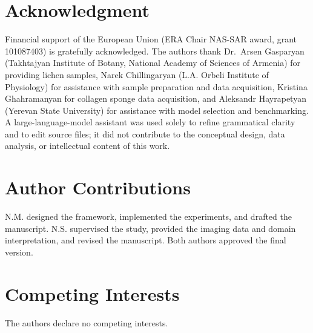 \documentclass[journal]{IEEEtran}
\begin{document}
\section*{Acknowledgment}
Financial support of the European Union (ERA Chair NAS-SAR award, grant 101087403) is gratefully acknowledged. The authors thank Dr.~Arsen Gasparyan (Takhtajyan Institute of Botany, National Academy of Sciences of Armenia) for providing lichen samples, Narek Chillingaryan (L.A. Orbeli Institute of Physiology) for assistance with sample preparation and data acquisition, Kristina Ghahramanyan for collagen sponge data acquisition, and Aleksandr Hayrapetyan (Yerevan State University) for assistance with model selection and benchmarking. A large-language-model assistant was used solely to refine grammatical clarity and to edit source files; it did not contribute to the conceptual design, data analysis, or intellectual content of this work.

\section*{Author Contributions}
N.M. designed the framework, implemented the experiments, and drafted the manuscript. N.S. supervised the study, provided the imaging data and domain interpretation, and revised the manuscript. Both authors approved the final version.

\section*{Competing Interests}
The authors declare no competing interests.



\end{document}
